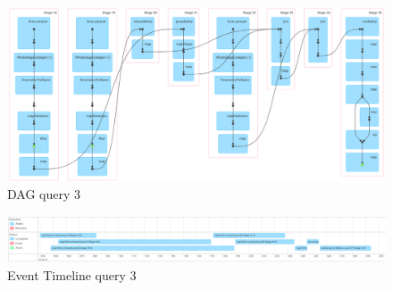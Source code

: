 \documentclass[conference]{IEEEtran}
\begin{document}
\begin{figure}[htbp]
\includegraphics[scale=0.196]{Screenshot/Query3_DAG.png}
\caption{DAG query 3}\label{Query3_DAG}
\label{fig}
\end{figure}
\begin{figure}[htbp]
\includegraphics[scale=0.15]{Screenshot/Query3_timeline.png}
\caption{Event Timeline query 3}\label{Query3_TL}
\label{fig}
\end{figure}
\end{document}

